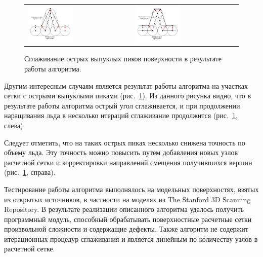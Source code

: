 \begin{figure}[ht]
\centering
\begin{tabular}{ll}
\includegraphics[width=0.45\textwidth]{./pics/text_1_remesh_common_envelope/peak1.pdf}
&
\includegraphics[width=0.45\textwidth]{./pics/text_1_remesh_common_envelope/peak2.pdf}
\end{tabular}
\singlespacing
{}\caption{Сглаживание острых выпуклых пиков поверхности в результате работы алгоритма.}
\label{fig:text_1_remesh3_common_envelope_peak}
\end{figure}

Другим интересным случаям является результат работы алгоритма на участках сетки с острыми выпуклыми пиками (рис.~\ref{fig:text_1_remesh3_common_envelope_peak}).
Из данного рисунка видно, что в результате работы алгоритма острый угол сглаживается, и при продолжении наращивания льда в несколько итераций сглаживание продолжится (рис.~\ref{fig:text_1_remesh3_common_envelope_peak}, слева).

Следует отметить, что на таких острых пиках несколько снижена точность по объему льда.
Эту точность можно повысить путем добавления новых узлов расчетной сетки и корректировки направлений смещения получившихся вершин (рис.~\ref{fig:text_1_remesh3_common_envelope_peak}, справа).

Тестирование работы алгоритма выполнялось на модельных поверхностях, взятых из открытых источников, в частности на моделях из The Stanford 3D Scanning Repository.
В результате реализации описанного алгоритма удалось получить программный модуль, способный обрабатывать поверхностные расчетные сетки произвольной сложности и содержащие дефекты.
Также алгоритм не содержит итерационных процедур сглаживания и является линейным по количеству узлов в расчетной сетке.

